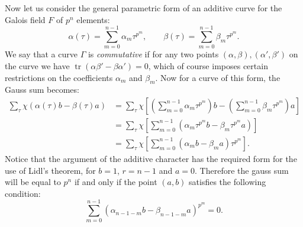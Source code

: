 \documentclass[a4paper]{article}
\DeclareMathOperator{\tr}{tr}
\begin{document}
  Now let us consider the general parametric form of an
  additive curve for the Galois field $F$ of $p^{n}$
  elements:
  \begin{equation}
    \alpha(\tau)
    = \sum_{m=0}^{n-1} \alpha_m \tau^{p^{m}},
    \quad
    \quad
    \beta(\tau)
    = \sum_{m=0}^{n-1} \beta_m \tau^{p^{m}}.
  \end{equation}
  We say that a curve $\Gamma$ is \textit{commutative} if
  for any two points $(\alpha,\beta), (\alpha',\beta')$ on
  the curve we have $\tr(\alpha \beta' - \beta \alpha') =
  0$, which of course imposes certain restrictions on the
  coefficients $\alpha_m$ and $\beta_m$. 
  Now for a curve of this form, the Gauss sum becomes:
  \begin{align}
    \sum_{\tau}^{} 
    \chi\left( \alpha(\tau)b - \beta(\tau)a \right) 
    &= \sum_{\tau}^{} 
    \chi\left[
    \left(
      \sum_{m=0}^{n-1} \alpha_m \tau^{p^{m}}
    \right)b
    - \left(
      \sum_{m=0}^{n-1} \beta_m \tau^{p^{m}}
    \right)a
    \right] \\
    &= \sum_{\tau}^{} 
    \chi\left[
      \sum_{m=0}^{n-1} \left(
        \alpha_m \tau^{p^{m}} b -
        \beta_m \tau^{p^{m}} a
      \right)
    \right] \\
    &= \sum_{\tau}^{} 
    \chi\left[
      \sum_{m=0}^{n-1} 
      (\alpha_m b - \beta_m a) \tau^{p^{m}}
    \right].
  \end{align}
  Notice that the argument of the additive character has the
  required form for the use of Lidl's theorem, for $b = 1$,
  $r = n-1$ and $a = 0$.  Therefore the gauss sum will be
  equal to $p^{n}$ if and only if the point $(a,b)$ 
  satisfies the following condition:
  \begin{equation}
    \label{eqn:lidl_cond}
      \sum_{m=0}^{n-1} 
      (\alpha_{n-1-m} b - \beta_{n-1-m} a)^{p^{m}}
      = 0.
  \end{equation}
\end{document}
